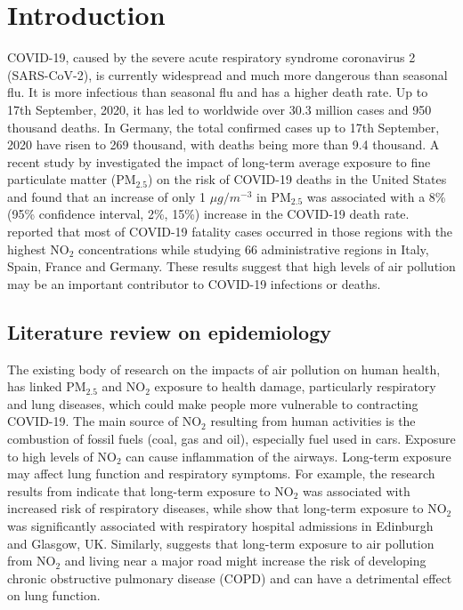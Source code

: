 \documentclass[12,]{article}
\begin{document}
\hypertarget{introduction}{%
\section{Introduction}\label{introduction}}

COVID-19, caused by the severe acute respiratory syndrome coronavirus 2
(SARS-CoV-2), is currently widespread and much more dangerous than
seasonal flu. It is more infectious than seasonal flu and has a higher
death rate. Up to 17th September, 2020, it has led to worldwide over
30.3 million cases and 950 thousand deaths. In Germany, the total
confirmed cases up to 17th September, 2020 have risen to 269 thousand,
with deaths being more than 9.4 thousand. A recent study by
\textcite{Wu2020} investigated the impact of long-term average exposure
to fine particulate matter (PM\(_{2.5}\)) on the risk of COVID-19 deaths
in the United States and found that an increase of only 1
\(\mu g/m^{-3}\) in PM\(_{2.5}\) was associated with a 8\% (95\%
confidence interval, 2\%, 15\%) increase in the COVID-19 death rate.
\textcite{Ogen2020} reported that most of COVID-19 fatality cases
occurred in those regions with the highest NO\(_2\) concentrations while
studying 66 administrative regions in Italy, Spain, France and Germany.
These results suggest that high levels of air pollution may be an
important contributor to COVID-19 infections or deaths.

\hypertarget{literature-review-on-epidemiology}{%
\subsection{Literature review on
epidemiology}\label{literature-review-on-epidemiology}}

The existing body of research on the impacts of air pollution on human
health, has linked PM\(_{2.5}\) and NO\(_2\) exposure to health damage,
particularly respiratory and lung diseases, which could make people more
vulnerable to contracting COVID-19. The main source of NO\(_2\)
resulting from human activities is the combustion of fossil fuels (coal,
gas and oil), especially fuel used in cars. Exposure to high levels of
NO\(_2\) can cause inflammation of the airways. Long-term exposure may
affect lung function and respiratory symptoms. For example, the research
results from \textcite{Bowatte2017} indicate that long-term exposure to
NO\(_2\) was associated with increased risk of respiratory diseases,
while \textcite{Lee2009} show that long-term exposure to NO\(_{2}\) was
significantly associated with respiratory hospital admissions in
Edinburgh and Glasgow, UK. Similarly, \textcite{Schikowski2005} suggests
that long-term exposure to air pollution from NO\(_2\) and living near a
major road might increase the risk of developing chronic obstructive
pulmonary disease (COPD) and can have a detrimental effect on lung
function.
\end{document}
